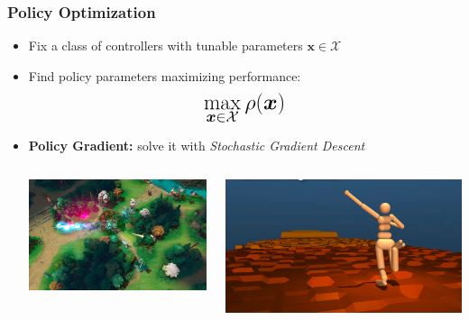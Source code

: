 \documentclass{beamer}
\begin{document}
\begin{frame}
\frametitle{Policy Optimization}
\begin{itemize}
	\item Fix a class of controllers with tunable parameters $\boldsymbol{x}\in\mathcal{X}$
	\item Find policy parameters maximizing performance:
	\[	\LARGE
		\max\limits_{\boldsymbol{x}\in\mathcal{X}} \rho(\boldsymbol{x})
	\]
	\vfill
	\item \textbf{Policy Gradient:} solve it with \emph{Stochastic Gradient Descent}
	\vfill
	\begin{columns}
		\begin{column}{.5\textwidth}
			\centering
			\includegraphics[width=.8\textwidth]{pics/dota.jpg}
			\\
			\emph{\cite{OpenAI_dota}}
		\end{column}
		\begin{column}{.5\textwidth}
			\centering
			\includegraphics[width=.8\textwidth]{pics/parkour.jpg}
			\\ 
			\emph{\cite{heess2017emergence}}
		\end{column}
	\end{columns}
\end{itemize}
\end{frame}
\end{document}
